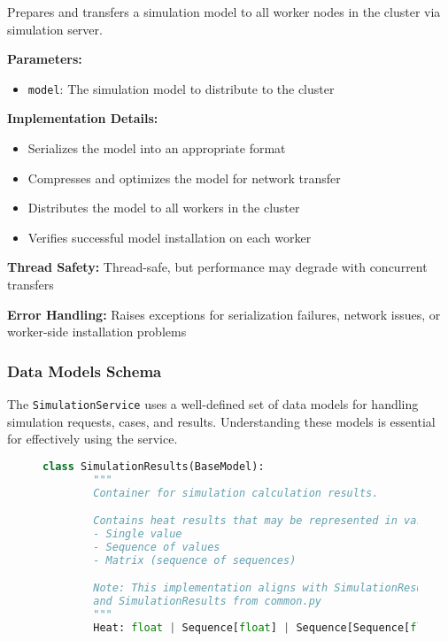 \begin{itemize}
	Prepares and transfers a simulation model to all worker nodes in the cluster via simulation server.

	\textbf{Parameters:}
	\begin{itemize}
		\item \texttt{model}: The simulation model to distribute to the cluster
	\end{itemize}

	\textbf{Implementation Details:}
	\begin{itemize}
		\item Serializes the model into an appropriate format
		\item Compresses and optimizes the model for network transfer
		\item Distributes the model to all workers in the cluster
		\item Verifies successful model installation on each worker
	\end{itemize}

	\textbf{Thread Safety:} Thread-safe, but performance may degrade with concurrent transfers

	\textbf{Error Handling:} Raises exceptions for serialization failures, network issues, or worker-side installation problems

\end{itemize}

\subsubsection{Data Models Schema}

The \texttt{SimulationService} uses a well-defined set of data models for handling simulation requests, cases, and results. Understanding these models is essential for effectively using the service.

\begin{figure}[H]
	\begin{lstlisting}[language=Python, caption={SimulationResults Model}]
		class SimulationResults(BaseModel):
		"""
		Container for simulation calculation results.

		Contains heat results that may be represented in various formats:
		- Single value
		- Sequence of values
		- Matrix (sequence of sequences)

		Note: This implementation aligns with SimulationResultType
		and SimulationResults from common.py
		"""
		Heat: float | Sequence[float] | Sequence[Sequence[float] | float]
	\end{lstlisting}
\end{figure}

